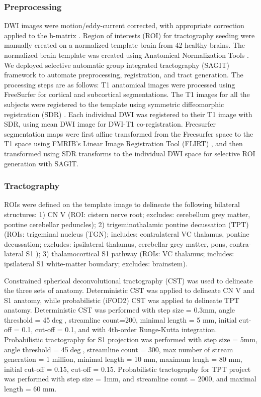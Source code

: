 \subsubsection{Preprocessing}
DWI images were motion/eddy-current corrected, with appropriate correction applied to the b-matrix \cite{Leemans2009}. Region of interests (ROI) for tractography seeding were manually created on a normalized template brain from 42 healthy brains. The normalized brain template was created using Anatomical Normalization Tools \cite{Avants2010,Avants2011}. We deployed selective automatic group integrated tractography (SAGIT) framework to automate preprocessing, registration, and tract generation. The processing steps are as follows: T1 anatomical images were processed using FreeSurfer \cite{Fischl2004} for cortical and subcortical segmentations. The T1 images for all the subjects were registered to the template using symmetric diffeomorphic registration (SDR) \cite{Avants2008b}. Each individual DWI was registered to their T1 image with SDR, using mean DWI image for DWI-T1 co-registration. Freesurfer segmentation maps were first affine transformed from the Freesurfer space to the T1 space using FMRIB's Linear Image Registration Tool (FLIRT) \cite{Jenkinson2001,Jenkinson2002}, and then transformed using SDR transforms to the individual DWI space for selective ROI generation with SAGIT.

\subsubsection{Tractography}
ROIs were defined on the template image to delineate the following bilateral structures: 1) CN V (ROI: cistern nerve root; excludes: cerebellum grey matter, pontine cerebellar peduncles); 2) trigeminothalamic pontine decussation (TPT) (ROIs: trigeminal nucleus (TGN); includes: contralateral VC thalamus, pontine decussation; excludes: ipsilateral thalamus, cerebellar grey matter, pons, contra-lateral S1 ); 3) thalamocortical S1 pathway (ROIs: VC thalamus; includes: ipsilateral S1 white-matter boundary; excludes: brainstem).  

Constrained spherical deconvolutional tractography (CST) \cite{Tournier2012b} was used to delineate the three sets of anatomy. Deterministic CST was applied to delineate CN V and S1 anatomy, while probabilistic (iFOD2) CST \cite{Jeurissen2011b,Tournier2010} was applied to delineate TPT anatomy. Deterministic CST was performed with step size = 0.3mm, angle threshold = 45$\deg$, streamline count=200, minimal length = 5 mm, initial cut-off = 0.1, cut-off = 0.1, and with 4th-order Runge-Kutta integration. Probabilistic tractography for S1 projection was performed with step size = 5mm, angle threshold = 45$\deg$, streamline count = 300, max number of stream generation = 1 million, minimal length = 10 mm, maximum lengh = 80 mm, initial cut-off = 0.15, cut-off = 0.15. Probabilistic tractography for TPT project was performed with step size = 1mm, and streamline count = 2000, and maximal length = 60 mm. 


